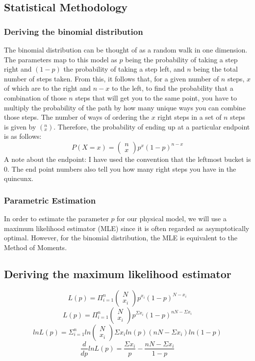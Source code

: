 \subsection{Statistical Methodology}
\subsubsection*{Deriving the binomial distribution}
The binomial distribution can be thought of as a random walk in one dimension. The parameters map to this model as $p$ being the probability of taking a step right and $(1-p)$ the probability of taking a step left, and $n$ being the total number of steps taken. From this, it follows that, for a given number of $n$ steps, $x$ of which are to the right and $n-x$ to the left, to find the probability that a combination of those $n$ steps that will get you to the same point, you have to multiply the probability of the path by how many unique ways you can combine those steps. The number of ways of ordering the $x$ right steps in a set of $n$ steps is given by $(^n_x)$. Therefore, the probability of ending up at a particular endpoint is as follows: $$P(X=x)=\left(\begin{array}{c}n\\x\end{array}\right)p^x(1-p)^{n-x}$$
A note about the endpoint: I have used the convention that the leftmost bucket is 0. The end point numbers also tell you how many right steps you have in the quincunx.
\subsubsection*{Parametric Estimation}
In order to estimate the parameter $p$ for our physical model, we will use a maximum likelihood estimator (MLE) since it is often regarded as asymptotically optimal. However, for the binomial distribution, the MLE is equivalent to the Method of Moments.
\subsection*{Deriving the maximum likelihood estimator}
$$L(p)=\Pi^n_{i=1}\left(\begin{array}{c}N\\x_i\end{array}\right)p^{x_i}(1-p)^{N-x_i}$$
$$L(p)=\Pi^n_{i=1}\left(\begin{array}{c}N\\x_i\end{array}\right)p^{\Sigma x_i}(1-p)^{nN-\Sigma x_i}$$
$$lnL(p)=\Sigma^n_{i=1}ln\left(\begin{array}{c}N\\x_i\end{array}\right)\Sigma x_i ln(p)(nN-\Sigma x_i)ln(1-p)$$
$$\frac{d}{dp}lnL(p)=\frac{\Sigma x_i}{p}-\frac{nN-\Sigma x_i}{1-p}$$

